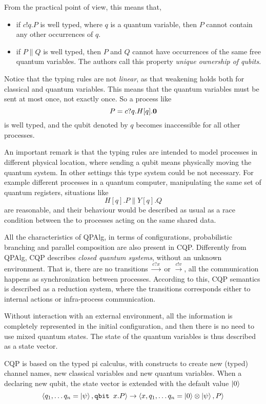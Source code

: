 From the practical point of view, this means that, \begin{itemize} 
\item if $c!q.P$ is well typed, where $q$ is a quantum variable, then $P$ cannot contain any other occurrences of $q$.
\item if $P \parallel Q$ is well typed, then $P$ and $Q$ cannot have occurrences of the same free quantum variables. The authors call this property \textit{unique ownership of qubits}.
\end{itemize}

Notice that the typing rules are not \textit{linear}, as that weakening holds both for classical and quantum variables. This means that the quantum variables must be sent at most once, not exactly once. So a process like 
\[P = c?q.H[q].\mathbf{0}\]
is well typed, and the qubit denoted by $q$ becomes inaccessible for all other processes.

An important remark is that the typing rules are intended to model processes in different physical location, where sending a qubit means physically moving the quantum system. In other settings this type system could be not necessary. For example different processes in a quantum computer, manipulating the same set of quantum registers, situations like 
\[ H[q].P \parallel Y[q].Q\]
are reasonable, and their behaviour would be described as usual as a race condition between the to processes acting on the same shared data.


All the characteristics of QPAlg, in terms of configurations, probabilistic branching and parallel composition are also present in CQP. Differently from QPAlg, CQP  describes \textit{closed quantum systems}, without an unknown environment. That is, there are no transitions $\xrightarrow{c?x}$ or $\xrightarrow{c!v}$, all the communication happens as synchronization between processes. According to this, CQP semantics is described as a reduction system, where the transitions corresponds either to internal actions or infra-process communication.  


Without interaction with an external environment, all the information is completely represented in the initial configuration, and then there is no need to use mixed quantum states. The state of the quantum variables is thus described as a state vector.


CQP is based on the typed pi calculus, with constructs to create new (typed) channel names, new classical variables and new quantum variables. When a declaring  new qubit, the state vector is extended with the default value $\ket{0}$
\[ \langle q_1, \ldots q_n = \ket{\psi}, \texttt{qbit }x.P\rangle \rightarrow \langle x,q_1, \ldots q_n = \ket{0}\otimes\ket{\psi} , P\rangle\]

